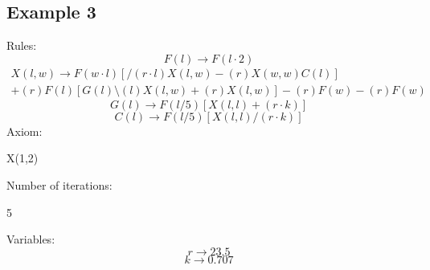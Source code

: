 \documentclass[b5paper,twoside,11pt]{article}
\begin{document}
\subsection*{Example 3}
Rules: \newline
\begin{equation*}
F(l)\rightarrow F(l\cdot2) 
\end{equation*}
\begin{multline*}
X(l,w) \rightarrow F(w\cdot l)[/(r\cdot l)X(l,w)-(r)X(w,w)C(l)]\\
+(r)F(l)[G(l)\setminus(l)X(l,w)+(r)X(l,w)]-(r)F(w)-(r)F(w)
\end{multline*}
\begin{equation*}
G(l) \rightarrow F(l/5)[X(l,l)+(r\cdot k)]
\end{equation*}
\begin{equation*}
C(l) \rightarrow F(l/5)[X(l,l)/(r\cdot k)]
\end{equation*}
Axiom:
\begin{center}
X(1,2)
\end{center}
Number of iterations:
\begin{center}
5
\end{center}
Variables:
\begin{equation*}
r\rightarrow 23.5
\end{equation*}
\begin{equation*}
k\rightarrow 0.707
\end{equation*}
\end{document}
